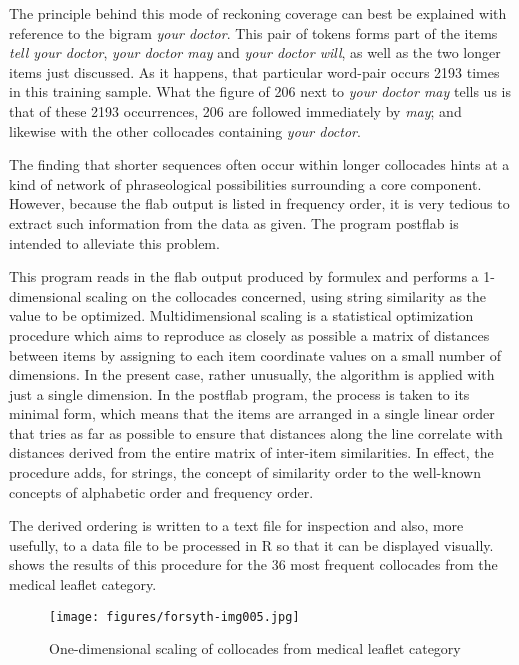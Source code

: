 \documentclass[output=paper]{langscibook}
\begin{document}
The principle behind this mode of reckoning coverage can best be explained with reference to the bigram \textit{your doctor}. This pair of tokens forms part of the items \textit{tell your doctor}, \textit{your doctor may} and \textit{your doctor will}, as well as the two longer items just discussed. As it happens, that particular word-pair occurs 2193 times in this training sample. What the figure of 206 next to \textit{your doctor may} tells us is that of these 2193 occurrences, 206 are followed immediately by \textit{may}; and likewise with the other collocades containing \textit{your doctor}.

The finding that shorter sequences often occur within longer collocades hints at a kind of network of phraseological possibilities surrounding a core component. However, because the flab output is listed in frequency order, it is very tedious to extract such information from the data as given. The program postflab is intended to alleviate this problem.

This program reads in the flab output produced by formulex and performs a 1-dimensional scaling on the collocades concerned, using string similarity as the value to be optimized. Multidimensional scaling \citep{UptonCook2006}  is a statistical optimization procedure which aims to reproduce as closely as possible a matrix of distances between items by assigning to each item coordinate values on a small number of dimensions. In the present case, rather unusually, the algorithm is applied with just a single dimension. In the postflab program, the process is taken to its minimal form, which means that the items are arranged in a single linear order that tries as far as possible to ensure that distances along the line correlate with distances derived from the entire matrix of inter-item similarities. In effect, the procedure adds, for strings, the concept of similarity order to the well-known concepts of alphabetic order and frequency order.

The derived ordering is written to a text file for inspection and also, more usefully, to a data file to be processed in R so that it can be displayed visually.  shows the results of this procedure for the 36 most frequent collocades from the medical leaflet category.

  
\begin{figure}
\texttt{[image: figures/forsyth-img005.jpg]}
\caption{One-dimensional scaling of collocades from medical leaflet category}
\label{fig:forsyth:4}
\end{figure}
\end{document}
